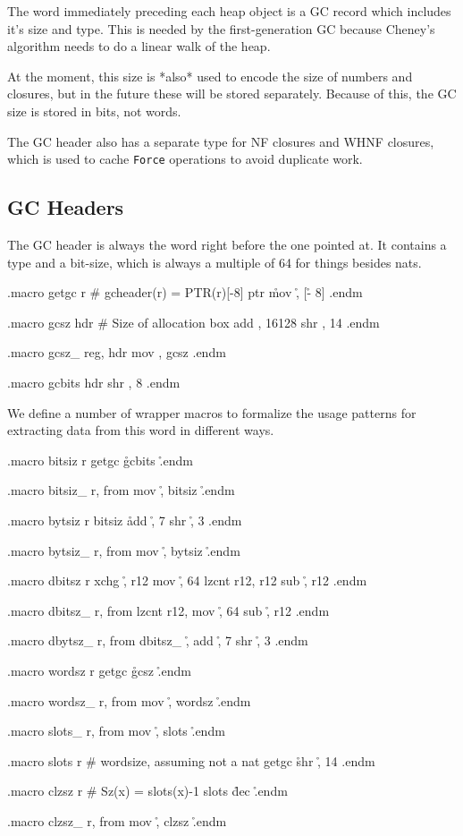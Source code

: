 The word immediately preceding each heap object is a GC record which
includes it's size and type.  This is needed by the first-generation GC
because Cheney's algorithm needs to do a linear walk of the heap.

At the moment, this size is *also* used to encode the size of numbers and
closures, but in the future these will be stored separately.  Because of
this, the GC size is stored in bits, not words.

The GC header also has a separate type for NF closures and WHNF closures,
which is used to cache \lstinline|Force| operations to avoid duplicate work.

\subsection{GC Headers}

The GC header is always the word right before the one pointed at.
It contains a type and a bit-size, which is always a multiple of 64 for
things besides nats.

\begin{asm}
.macro getgc r                              # gcheader(r) = PTR(r)[-8]
	ptr	\r
	mov	\r, [\r - 8]
.endm

.macro gcsz hdr                             # Size of allocation box
	add	\hdr, 16128
	shr	\hdr, 14
.endm

.macro gcsz_ reg, hdr
	mov	\reg, \hdr
	gcsz	\reg
.endm

.macro gcbits hdr
	shr	\hdr, 8
.endm
\end{asm}

We define a number of wrapper macros to formalize the usage patterns
for extracting data from this word in different ways.

\begin{asm}
.macro bitsiz r
	getgc	\r
	gcbits	\r
.endm

.macro bitsiz_ r, from
	mov	\r, \from
	bitsiz	\r
.endm

.macro bytsiz r
	bitsiz	\r
	add	\r, 7
	shr	\r, 3
.endm

.macro bytsiz_ r, from
	mov	\r, \from
	bytsiz	\r
.endm

.macro dbitsz r
	xchg	\r, r12
	mov	\r, 64
	lzcnt	r12, r12
	sub	\r, r12
.endm

.macro dbitsz_ r, from
	lzcnt	r12, \from
	mov	\r, 64
	sub	\r, r12
.endm

.macro dbytsz_ r, from
	dbitsz_	\r, \from
	add	\r, 7
	shr	\r, 3
.endm

.macro wordsz r
	getgc	\r
	gcsz	\r
.endm

.macro wordsz_ r, from
	mov	\r, \from
	wordsz	\r
.endm

.macro slots_ r, from
	mov	\r, \from
	slots	\r
.endm

.macro slots r                              # wordsize, assuming not a nat
	getgc	\r
	shr	\r, 14
.endm

.macro clzsz r                              # Sz(x) = slots(x)-1
	slots	\r
	dec	\r
.endm

.macro clzsz_ r, from
	mov	\r, \from
	clzsz	\r
.endm

\end{asm}

